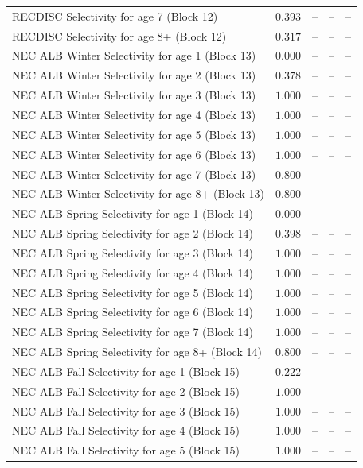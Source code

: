 \documentclass[
]{article}
\begin{document}
\begin{landscape}
\begin{longtable}[t]{lrrrr}
\addlinespace
RECDISC Selectivity for age 7 (Block 12) & $0.393$ & -- & -- & --\\
RECDISC Selectivity for age 8+ (Block 12) & $0.317$ & -- & -- & --\\
NEC ALB Winter Selectivity for age 1 (Block 13) & $0.000$ & -- & -- & --\\
NEC ALB Winter Selectivity for age 2 (Block 13) & $0.378$ & -- & -- & --\\
NEC ALB Winter Selectivity for age 3 (Block 13) & $1.000$ & -- & -- & --\\
\addlinespace
NEC ALB Winter Selectivity for age 4 (Block 13) & $1.000$ & -- & -- & --\\
NEC ALB Winter Selectivity for age 5 (Block 13) & $1.000$ & -- & -- & --\\
NEC ALB Winter Selectivity for age 6 (Block 13) & $1.000$ & -- & -- & --\\
NEC ALB Winter Selectivity for age 7 (Block 13) & $0.800$ & -- & -- & --\\
NEC ALB Winter Selectivity for age 8+ (Block 13) & $0.800$ & -- & -- & --\\
\addlinespace
NEC ALB Spring Selectivity for age 1 (Block 14) & $0.000$ & -- & -- & --\\
NEC ALB Spring Selectivity for age 2 (Block 14) & $0.398$ & -- & -- & --\\
NEC ALB Spring Selectivity for age 3 (Block 14) & $1.000$ & -- & -- & --\\
NEC ALB Spring Selectivity for age 4 (Block 14) & $1.000$ & -- & -- & --\\
NEC ALB Spring Selectivity for age 5 (Block 14) & $1.000$ & -- & -- & --\\
\addlinespace
NEC ALB Spring Selectivity for age 6 (Block 14) & $1.000$ & -- & -- & --\\
NEC ALB Spring Selectivity for age 7 (Block 14) & $1.000$ & -- & -- & --\\
NEC ALB Spring Selectivity for age 8+ (Block 14) & $0.800$ & -- & -- & --\\
NEC ALB Fall Selectivity for age 1 (Block 15) & $0.222$ & -- & -- & --\\
NEC ALB Fall Selectivity for age 2 (Block 15) & $1.000$ & -- & -- & --\\
\addlinespace
NEC ALB Fall Selectivity for age 3 (Block 15) & $1.000$ & -- & -- & --\\
NEC ALB Fall Selectivity for age 4 (Block 15) & $1.000$ & -- & -- & --\\
NEC ALB Fall Selectivity for age 5 (Block 15) & $1.000$ & -- & -- & --\\

\end{longtable}
\end{landscape}
\end{document}
